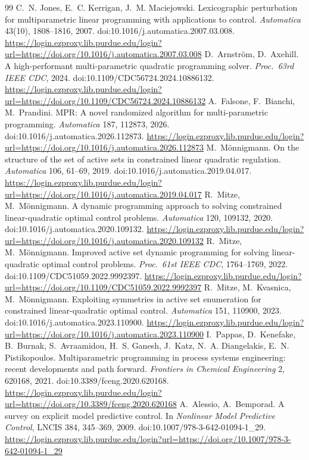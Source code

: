 \documentclass[11pt]{article}
\begin{document}
\begin{thebibliography}{99}
 C.~N. Jones, E.~C. Kerrigan, J.~M. Maciejowski. Lexicographic perturbation for multiparametric linear programming with applications to control. \emph{Automatica} 43(10), 1808--1816, 2007. doi:10.1016/j.automatica.2007.03.008.
\url{https://login.ezproxy.lib.purdue.edu/login?url=https://doi.org/10.1016/j.automatica.2007.03.008}
 D.~Arnstr\"om, D.~Axehill. A high-performant multi-parametric quadratic programming solver. \emph{Proc.\ 63rd IEEE CDC}, 2024. doi:10.1109/CDC56724.2024.10886132.
\url{https://login.ezproxy.lib.purdue.edu/login?url=https://doi.org/10.1109/CDC56724.2024.10886132}
 A.~Falsone, F.~Bianchi, M.~Prandini. MPR: A novel randomized algorithm for multi-parametric programming. \emph{Automatica} 187, 112873, 2026. doi:10.1016/j.automatica.2026.112873.
\url{https://login.ezproxy.lib.purdue.edu/login?url=https://doi.org/10.1016/j.automatica.2026.112873}
 M.~M\"onnigmann. On the structure of the set of active sets in constrained linear quadratic regulation. \emph{Automatica} 106, 61--69, 2019. doi:10.1016/j.automatica.2019.04.017.
\url{https://login.ezproxy.lib.purdue.edu/login?url=https://doi.org/10.1016/j.automatica.2019.04.017}
 R.~Mitze, M.~M\"onnigmann. A dynamic programming approach to solving constrained linear-quadratic optimal control problems. \emph{Automatica} 120, 109132, 2020. doi:10.1016/j.automatica.2020.109132.
\url{https://login.ezproxy.lib.purdue.edu/login?url=https://doi.org/10.1016/j.automatica.2020.109132}
 R.~Mitze, M.~M\"onnigmann. Improved active set dynamic programming for solving linear-quadratic optimal control problems. \emph{Proc.\ 61st IEEE CDC}, 1764--1769, 2022. doi:10.1109/CDC51059.2022.9992397.
\url{https://login.ezproxy.lib.purdue.edu/login?url=https://doi.org/10.1109/CDC51059.2022.9992397}
 R.~Mitze, M.~Kvasnica, M.~M\"onnigmann. Exploiting symmetries in active set enumeration for constrained linear-quadratic optimal control. \emph{Automatica} 151, 110900, 2023. doi:10.1016/j.automatica.2023.110900.
\url{https://login.ezproxy.lib.purdue.edu/login?url=https://doi.org/10.1016/j.automatica.2023.110900}
 I.~Pappas, D.~Kenefake, B.~Burnak, S.~Avraamidou, H.~S. Ganesh, J.~Katz, N.~A. Diangelakis, E.~N. Pistikopoulos. Multiparametric programming in process systems engineering: recent developments and path forward. \emph{Frontiers in Chemical Engineering} 2, 620168, 2021. doi:10.3389/fceng.2020.620168.
\url{https://login.ezproxy.lib.purdue.edu/login?url=https://doi.org/10.3389/fceng.2020.620168}
 A.~Alessio, A.~Bemporad. A survey on explicit model predictive control. In \emph{Nonlinear Model Predictive Control}, LNCIS 384, 345--369, 2009. doi:10.1007/978-3-642-01094-1\_29.
\url{https://login.ezproxy.lib.purdue.edu/login?url=https://doi.org/10.1007/978-3-642-01094-1_29}
\end{thebibliography}
\end{document}
